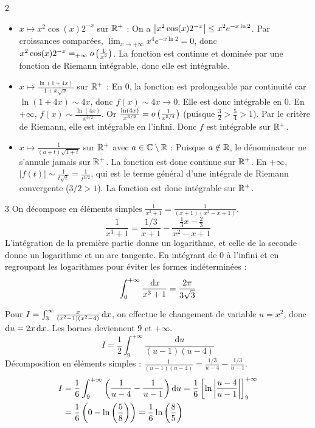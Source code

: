 \begin{correction}{2}
\begin{itemize}
    \item $x \mapsto x^2 \cos(x) 2^{-x}$ sur $\mathbb{R}^{+}$ :
    On a $\left|x^2 \cos(x) 2^{-x}\right| \le x^2 e^{-x \ln 2}$. Par croissances comparées, $\lim_{x\to +\infty} x^4 e^{-x \ln 2} = 0$, donc $x^2 \cos(x) 2^{-x} =_{+\infty} o\left(\frac{1}{x^2}\right)$. La fonction est continue et dominée par une fonction de Riemann intégrable, donc elle est intégrable.
    
    \item $x \mapsto \frac{\ln(1+4x)}{1+x\sqrt{x}}$ sur $\mathbb{R}^{+}$ :
    En $0$, la fonction est prolongeable par continuité car $\ln(1+4x) \sim 4x$, donc $f(x) \sim 4x \to 0$. Elle est donc intégrable en 0.
    En $+\infty$, $f(x) \sim \frac{\ln(4x)}{x^{3/2}}$. Or $\frac{\ln(4x)}{x^{3/2}} = o\left(\frac{1}{x^{5/4}}\right)$ (puisque $\frac{3}{2} > \frac{5}{4} > 1$). Par le critère de Riemann, elle est intégrable en l'infini. Donc $f$ est intégrable sur $\mathbb{R}^+$.
    
    \item $x \mapsto \frac{1}{(a+t)\sqrt{1+t}}$ sur $\mathbb{R}^{+}$ avec $a\in\mathbb{C}\setminus\mathbb{R}$ :
    Puisque $a \notin \mathbb{R}$, le dénominateur ne s'annule jamais sur $\mathbb{R}^+$. La fonction est donc continue sur $\mathbb{R}^+$. En $+\infty$, $|f(t)| \sim \frac{1}{t \sqrt{t}} = \frac{1}{t^{3/2}}$, qui est le terme général d'une intégrale de Riemann convergente ($3/2 > 1$). La fonction est donc intégrable sur $\mathbb{R}^+$.
\end{itemize}
\end{correction}

\begin{correction}{3}
On décompose en éléments simples $\frac{1}{x^3+1} = \frac{1}{(x+1)(x^2-x+1)}$.
$$ \frac{1}{x^3+1} = \frac{1/3}{x+1} - \frac{\frac{1}{3}x - \frac{2}{3}}{x^2-x+1} $$
L'intégration de la première partie donne un logarithme, et celle de la seconde donne un logarithme et un arc tangente. En intégrant de 0 à l'infini et en regroupant les logarithmes pour éviter les formes indéterminées :
$$ \int_0^{+\infty} \frac{\,\mathrm{d}x}{x^3+1} = \frac{2\pi}{3\sqrt{3}} $$

Pour $I = \int_{3}^{\infty}\frac{x}{(x^{2}-1)(x^{2}-4)}\,\mathrm{d}x$, on effectue le changement de variable $u = x^2$, donc $\mathrm{d}u = 2x\,\mathrm{d}x$. Les bornes deviennent 9 et $+\infty$.
$$ I = \frac{1}{2} \int_{9}^{+\infty} \frac{\mathrm{d}u}{(u-1)(u-4)} $$
Décomposition en éléments simples : $\frac{1}{(u-1)(u-4)} = \frac{1/3}{u-4} - \frac{1/3}{u-1}$.
\begin{align*}
I &= \frac{1}{6} \int_{9}^{+\infty} \left(\frac{1}{u-4} - \frac{1}{u-1}\right) \mathrm{d}u = \frac{1}{6} \left[ \ln\left|\frac{u-4}{u-1}\right| \right]_{9}^{+\infty} \\
  &= \frac{1}{6} \left( 0 - \ln\left(\frac{5}{8}\right) \right) = \frac{1}{6} \ln\left(\frac{8}{5}\right)
\end{align*}
\end{correction}

